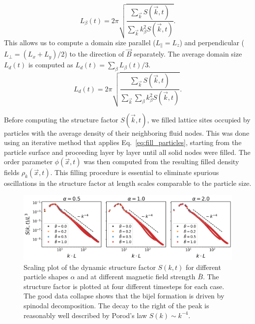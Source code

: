     \begin{equation}
    L_\beta(t)=2\pi\sqrt{\frac{\sum_{\vec{k}}S(\vec{k},t)}{\sum_{\vec{k}}k_\beta^2 S(\vec{k},t)}} .
    \end{equation}
    This allows us to compute a domain size parallel
    (\(L_\parallel=L_z\)) and perpendicular (\(L_\perp=(L_x+L_y)/2\)) to the
    direction of \(\vec{B}\) separately. The average domain size \(L_d(t)\)
    is computed as \(L_d(t)=\sum_\beta L_\beta(t) / 3\).
    \begin{equation}
    L_d(t)=2\pi\sqrt{\frac{\sum_{\vec{k}}S(\vec{k},t)}{\sum_{\vec{k}}\sum_\beta k_\beta^2 S(\vec{k},t)}} .
    \end{equation}
    
Before computing the structure factor \(S(\vec{k}, t)\), we filled lattice sites occupied by particles with the average density of 
their neighboring fluid nodes. This was done using an iterative method that applies Eq.~\eqref{eq:fill_particles}, starting from the 
particle surface and proceeding layer by layer until all solid nodes were filled. The order parameter \(\phi(\vec{x}, t)\) was then 
computed from the resulting filled density fields \(\rho_k(\vec{x}, t)\). This filling procedure is essential to eliminate spurious 
oscillations in the structure factor at length scales comparable to the particle size.
    
    
    \begin{figure}
        \centering
        \includegraphics[width=\textwidth]{../figures/results/paper1/structure_factor.png}
        \caption{Scaling plot of the dynamic structure factor $S(k,t)$ for different particle shapes $\alpha$ and at different magnetic field 
                 strength $\bar{B}$. The structure factor is plotted at four different timesteps for each case. The good data collapse shows 
                 that the bijel formation is driven by spinodal decomposition. The decay to the right of the peak is reasonably well described 
                 by Porod's law $S(k)\sim k^{-4}$.}
    \label{fig:structure_factor}
    \end{figure}
    
